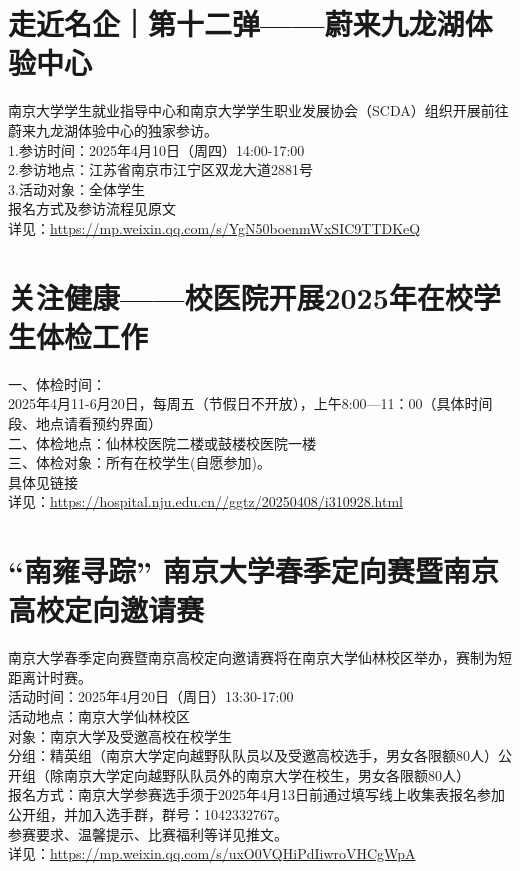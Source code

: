\documentclass[letterpaper, 12pt]{article}
\begin{document}
\begin{multicols}{2}
\section{走近名企｜第十二弹——蔚来九龙湖体验中心}
南京大学学生就业指导中心和南京大学学生职业发展协会（SCDA）组织开展前往蔚来九龙湖体验中心的独家参访。
\\1.参访时间：2025年4月10日（周四）14:00-17:00
\\2.参访地点：江苏省南京市江宁区双龙大道2881号
\\3.活动对象：全体学生
\\报名方式及参访流程见原文
\\详见：\url{https://mp.weixin.qq.com/s/YgN50boenmWxSIC9TTDKeQ}

\section{关注健康——校医院开展2025年在校学生体检工作}
一、体检时间：
\\2025年4月11-6月20日，每周五（节假日不开放），上午8:00—11：00（具体时间段、地点请看预约界面）
\\二、体检地点：仙林校医院二楼或鼓楼校医院一楼
\\三、体检对象：所有在校学生(自愿参加)。
\\具体见链接
\\详见：\url{https://hospital.nju.edu.cn//ggtz/20250408/i310928.html}


\section{“南雍寻踪” 南京大学春季定向赛暨南京高校定向邀请赛}
南京大学春季定向赛暨南京高校定向邀请赛将在南京大学仙林校区举办，赛制为短距离计时赛。
\\活动时间：2025年4月20日（周日）13:30-17:00
\\活动地点：南京大学仙林校区
\\对象：南京大学及受邀高校在校学生
\\分组：精英组（南京大学定向越野队队员以及受邀高校选手，男女各限额80人）公开组（除南京大学定向越野队队员外的南京大学在校生，男女各限额80人）
\\报名方式：南京大学参赛选手须于2025年4月13日前通过填写线上收集表报名参加公开组，并加入选手群，群号：1042332767。
\\参赛要求、温馨提示、比赛福利等详见推文。
\\详见：\url{https://mp.weixin.qq.com/s/uxO0VQHiPdIiwroVHCgWpA}



\end{multicols}
\end{document}
